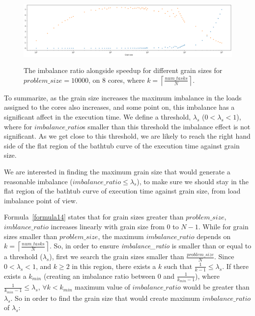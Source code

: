 \vspace{\baselineskip}	
\begin{figure}[H]
	\centering
	{\includegraphics[scale=.3]{images/hpx_for_loop/imbalance_ratio_speedup_100000_8.png}}
	\caption{The imbalance ratio alongside speedup for different grain sizes for $problem\_size=10000$, on 8 cores, where $k=\left\lceil{\frac{num\_{tasks}}{N}}\right \rceil$.}\label{fig37}		
\end{figure}


To summarize, as the grain size increases the maximum imbalance in the loads assigned to the cores also increases, and some point on, this imbalance has a significant affect in the execution time. We define a threshold, $\lambda_s$ ($0<\lambda_s<1$), where for $imbalance\_{ratio}$s smaller than this threshold the imbalance effect is not significant. As we get close to this threshold, we are likely to reach the right hand side of the flat region of the bathtub curve of the execution time against grain size. 


We are interested in finding the maximum grain size that would generate a reasonable imbalance ($imbalance\_{ratio}\leq{\lambda_s}$), to make sure we should stay in the flat region of the bathtub curve of execution time against grain size, from load imbalance point of view.  

Formula~\ref{formula14} states that for grain sizes greater than $problem\_{size}$, $imblance\_{ratio}$ increases linearly with grain size from $0$ to $N-1$. While for grain sizes smaller than $problem\_{size}$, the maximum $imbalance\_{ratio}$ depends on $k=\left\lceil{\frac{num\_{tasks}}{N}}\right\rceil$. So, in order to ensure \emph{imbalance\_{ratio}} is smaller than or equal to a threshold ($\lambda_s$), first we search the grain sizes smaller than $\frac{problem\_{size}}{N}$. Since $0<\lambda_s<1$, and $k\geq2$ in this region, there exists a $k$ such that $\frac{1}{k-1}\leq\lambda_s$.    
If there exists a $k_{min}$ (creating an imbalance ratio between $0$ and $\frac{1}{k_{min}-1}$), where $\frac{1}{k_{min}-1}\leq{\lambda_s}$, $\forall k<k_{min}$ maximum value of $imbalance\_{ratio}$ would be greater than $\lambda_s$. So in order to find the grain size that would create maximum $imbalance\_{ratio}$ of $\lambda_s$:



